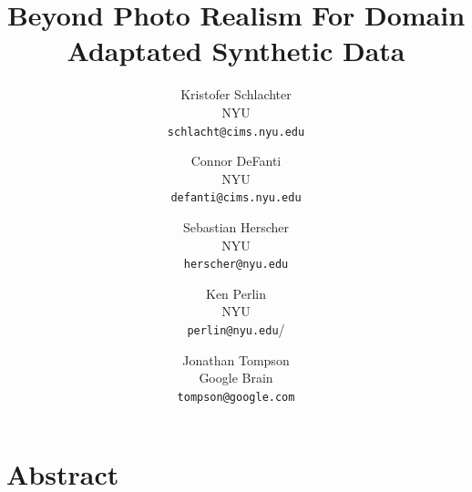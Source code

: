 \documentclass[10pt,twocolumn,letterpaper]{article}
\newcommand{\tompson}[1]{{\color{green} JT: #1}}
\begin{document}
\title{Beyond Photo Realism For Domain Adaptated Synthetic Data}

\author{Kristofer Schlachter\\
NYU\\
{\tt\small schlacht@cims.nyu.edu}
\and
Connor DeFanti\\
NYU\\
{\tt\small defanti@cims.nyu.edu}
\and
Sebastian Herscher\\
NYU\\
{\tt\small herscher@nyu.edu}
\and
Ken Perlin\\
NYU\\
{\tt\small perlin@nyu.edu}/
\and
Jonathan Tompson\\
Google Brain\\
{\tt\small tompson@google.com}
}

\maketitle
\maketitle

\section{Abstract}
\end{document}
